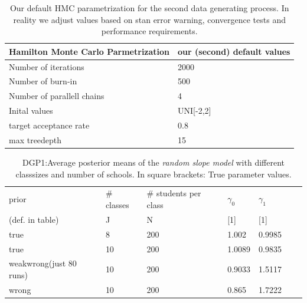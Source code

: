 \begin{table}[H]
\begin{center}
\begin{tabular}{l l}
Hamilton Monte Carlo Parmetrization & our (second) default values\\
\hline
Number of iterations &2000  \\
Number of burn-in & 500 \\
Number of parallell chains & 4  \\
Inital values & UNI[-2,2]  \\
target acceptance rate & 0.8  \\
max treedepth & 15 \\
\end{tabular}
\end{center}
\caption{Our default HMC parametrization for the second data generating process. In reality we adjust values based on stan error warning, convergence tests and performance requirements.}
\label{tab:default_2}
\end{table}


\begin{table}[H]
\begin{center}
\begin{tabular}{l  l  l  l  l  l  l  }
prior & \# classes & \#  students per class & $\gamma_0$ & $\gamma_1$\\
(def. in table)  & J  & N &  [1] &  [1] \\
\hline
true & 8  &  200  &  1.002  &  0.9985 \\
true & 10  &  200  &  1.0089  &  0.9835 \\
weakwrong(just 80 runs) & 10  &  200  &  0.9033  &  1.5117\\
wrong & 10  &  200  &  0.865  &  1.7222\\
\end{tabular}
\end{center}
\caption{DGP1:Average posterior means of the \emph{random slope model} with different classsizes and number of schools. In square brackets: True parameter values.}
\label{tab:bias_first}
\end{table}

